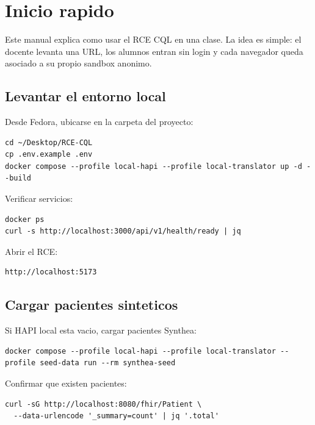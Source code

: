 \section{Inicio rapido}

Este manual explica como usar el RCE CQL en una clase. La idea es simple:
el docente levanta una URL, los alumnos entran sin login y cada navegador queda
asociado a su propio sandbox anonimo.

\subsection{Levantar el entorno local}

Desde Fedora, ubicarse en la carpeta del proyecto:

\begin{lstlisting}
cd ~/Desktop/RCE-CQL
cp .env.example .env
docker compose --profile local-hapi --profile local-translator up -d --build
\end{lstlisting}

Verificar servicios:

\begin{lstlisting}
docker ps
curl -s http://localhost:3000/api/v1/health/ready | jq
\end{lstlisting}

Abrir el RCE:

\begin{lstlisting}
http://localhost:5173
\end{lstlisting}


\subsection{Cargar pacientes sinteticos}

Si HAPI local esta vacio, cargar pacientes Synthea:

\begin{lstlisting}
docker compose --profile local-hapi --profile local-translator --profile seed-data run --rm synthea-seed
\end{lstlisting}

Confirmar que existen pacientes:

\begin{lstlisting}
curl -sG http://localhost:8080/fhir/Patient \
  --data-urlencode '_summary=count' | jq '.total'
\end{lstlisting}

